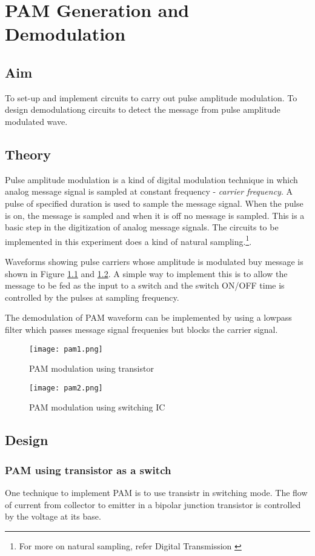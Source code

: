 \chapter[PAM Generation and Demodulation]{PAM Generation and Demodulation}

\section*{Aim}
To set-up and implement circuits to carry out pulse amplitude modulation. To design demodulationg circuits to detect the message from pulse amplitude modulated wave.
\section*{Theory}
Pulse amplitude modulation is a kind of digital modulation technique in which analog message signal is sampled at constant frequency - \emph{carrier frequency}. A pulse of specified duration is used to sample the message signal. When the pulse is on, the message is sampled and when it is off no message is sampled. This is a basic step in the digitization of analog message signals. The circuits to be implemented in this experiment does a kind of natural sampling.\footnote{For more on natural sampling, refer Digital Transmission \cite{Tomasi}}.

Waveforms showing pulse carriers whose amplitude is modulated buy message is shown in Figure \ref{PAMmod1} and \ref{PAMmod2}. A simple way to implement this is to allow the message to be fed as the input to a switch and the switch ON/OFF time is controlled by the pulses at sampling frequency.

The demodulation of PAM waveform can be implemented by using a lowpass filter which passes message signal frequenies but blocks the carrier signal.
\begin{figure}[h]
\texttt{[image: pam1.png]}
\caption{PAM modulation using transistor}
\label{PAMmod1}
\end{figure}

\begin{figure}[h]
\texttt{[image: pam2.png]}
\caption{PAM modulation using switching IC}
\label{PAMmod2}
\end{figure}
\section*{Design}
\subsection*{PAM using transistor as a switch}
One technique to implement PAM is to use transistr in switching mode. The flow of current from collector to emitter in a bipolar junction transistor is controlled by the voltage at its base. 


